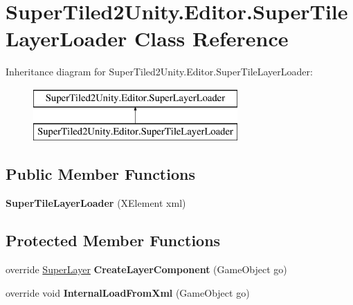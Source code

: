 \hypertarget{class_super_tiled2_unity_1_1_editor_1_1_super_tile_layer_loader}{}\section{Super\+Tiled2\+Unity.\+Editor.\+Super\+Tile\+Layer\+Loader Class Reference}
\label{class_super_tiled2_unity_1_1_editor_1_1_super_tile_layer_loader}
Inheritance diagram for Super\+Tiled2\+Unity.\+Editor.\+Super\+Tile\+Layer\+Loader\+:\begin{figure}[H]
\begin{center}
\leavevmode
\includegraphics[height=2.000000cm]{class_super_tiled2_unity_1_1_editor_1_1_super_tile_layer_loader}
\end{center}
\end{figure}
\subsection*{Public Member Functions}
\begin{DoxyCompactItemize}
\item 
\mbox{\label{class_super_tiled2_unity_1_1_editor_1_1_super_tile_layer_loader_a937edb1fcdd0f26f1823f20a86ac2655}} 
{\bfseries Super\+Tile\+Layer\+Loader} (X\+Element xml)
\end{DoxyCompactItemize}
\subsection*{Protected Member Functions}
\begin{DoxyCompactItemize}
\item 
\mbox{\label{class_super_tiled2_unity_1_1_editor_1_1_super_tile_layer_loader_a7fb98864acce4cfd65d73a44c9691f2d}} 
override \mbox{\hyperlink{class_super_tiled2_unity_1_1_super_layer}{Super\+Layer}} {\bfseries Create\+Layer\+Component} (Game\+Object go)
\item 
\mbox{\label{class_super_tiled2_unity_1_1_editor_1_1_super_tile_layer_loader_a6bc87689c6036cf46e443d31bf595842}} 
override void {\bfseries Internal\+Load\+From\+Xml} (Game\+Object go)
\end{DoxyCompactItemize}
